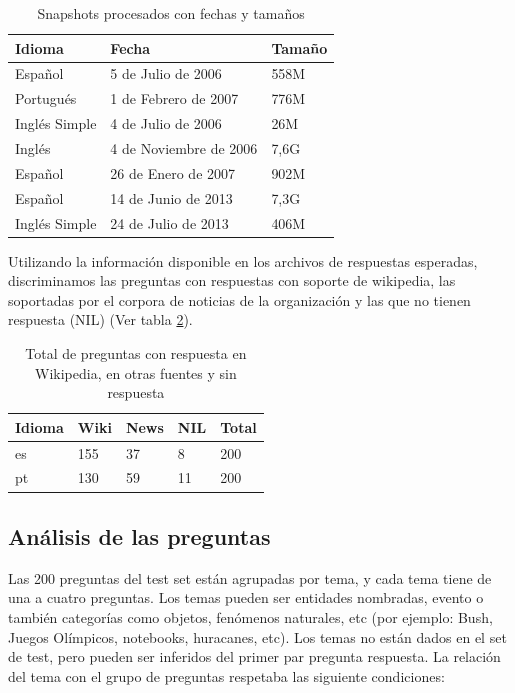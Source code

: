 \begin{center}
\begin{table}
\centering
\begin{tabular}{ | l | l | l |}
    \hline
    Idioma & Fecha & Tamaño  \\ \hline
    Español & 5 de Julio de 2006 & 558M  \\ \hline
    Portugués & 1 de Febrero de 2007 & 776M   \\ \hline
    Inglés Simple & 4 de Julio de 2006 & 26M  \\ \hline
    Inglés & 4 de Noviembre de 2006 & 7,6G    \\ \hline
    Español & 26 de Enero de 2007 & 902M    \\ \hline
    Español & 14 de Junio de 2013 & 7,3G    \\ \hline
    Inglés Simple & 24 de Julio de 2013 & 406M    \\ \hline
\end{tabular}
\caption{Snapshots procesados con fechas y tamaños}
\label{table:wikipedias}
\end{table}
\end{center}

Utilizando la información disponible en los archivos de respuestas esperadas, discriminamos las preguntas con respuestas con soporte de wikipedia, las soportadas por el corpora de noticias de la organización y las que no tienen respuesta (NIL) (Ver tabla \ref{table:preguntas-por-respuesta}).

\begin{center}
\begin{table}
\centering
\begin{tabular}{| l | l | l | l | l |}
\hline
Idioma & Wiki & News & NIL & Total \\ \hline
es & 155 & 37 & 8 & 200 \\ \hline
pt & 130 & 59 & 11 & 200 \\ \hline
\end{tabular}
\caption{Total de preguntas con respuesta en Wikipedia, en otras fuentes y sin respuesta}
\label{table:preguntas-por-respuesta}
\end{table}
\end{center}


\subsection{Análisis de las preguntas}

Las 200 preguntas del test set están agrupadas por tema, y cada tema tiene de una a cuatro preguntas. Los temas pueden ser entidades nombradas, evento o también categorías como objetos, fenómenos naturales, etc (por ejemplo: Bush, Juegos Olímpicos, notebooks, huracanes, etc).
Los temas no están dados en el set de test, pero pueden ser inferidos del primer par pregunta respuesta. La relación del tema con el grupo de preguntas respetaba las siguiente condiciones:


